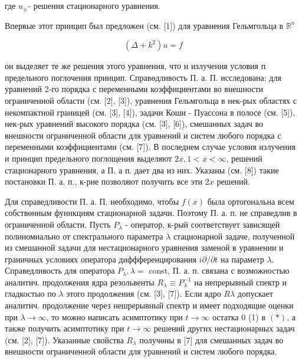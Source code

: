 \documentclass[10pt]{article}
\begin{document}
где $u_{ \pm}$- решения стационарного уравнения.



Впервые этот принцип был предложен (см. [1]) для уравнения Гельмгольца в $\mathbb{R}^{n}$



\[

\left(\Delta+k^{2}\right) u=f

\]



он выделяет те же решения этого уравнения, что и излучения условия п предельного поглочения принцип. Справөдливость П. а. П. исследована: для уравнений 2-го порядка с переменными коэффициентами во внешности ограниченной области (см. [2], [3]), уравнения Гельмгольца в нек-рых областях с некомпактной границей (см. [3], [4]), задачи Коши - Пуассона в полосе (см. [5]), нек-рых уравнений высокого порядка (см. [3], [6]), смешанных задач во внешности ограниченной области для уравнений и систем любого порядка с переменными коэффициентами (см. [7]). В последнем случае условия излучения и принцип предельного поглощения выделяют $2 x, 1<x<\infty$, решений стационарного уравнения, а П. а п. дает два из них. Указаны (см. [8]) такие постановки П. а. п., к-рне позволяют получить все эти $2 x$ решений.



Для справедливости П. а. П. необходимо, чтобы $f(x)$ была ортогональна всем собствөнным фуннкциям стационарной задачи. Поэтому П. а. п. не справедлив в ограниченной области. Пусть $P_{\lambda}$ - оператор, к-рый соответствует зависящей полиномиально от спектрального параметра $\lambda$ стационарной задаче, полученной из смешанной задачи для нестационарного уравнения заменой в уравнении и граничных условиях оператора диффференцирования $i \partial / \partial t$ на параметр $\lambda$. Справедливость для оператора $P_{\lambda}, \lambda=$ const, П. а. п. связана с возможностью аналитич. продолжения ядра резольвенты $R_{\lambda} \equiv P_{\lambda}^{-1}$ на непрерывный спектр и гладкостыо по $\lambda$ этого продолжения (см. [3], [7]). Если ядро $R \lambda$ допускает аналитич. продолжение через нешрерывный спектр и имеет подходящие оценки при $\lambda \rightarrow \infty$, то можно написать асимптотику при $t \rightarrow \infty$ остатка 0 (1) в $(*)$, а также получить асимптотику при $t \rightarrow \infty$ решений других нестационарных задач (см. [2], [7]). Указанные свойства $R_{\lambda}$ получөны в [7] для смешанных задач во внешности ограниченной области для уравнений и систем любого порядка.
\end{document}
